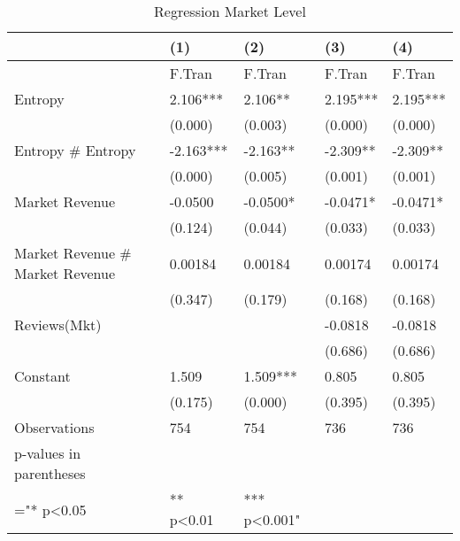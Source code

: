 \begin{table}
\centering
\begin{tabular}{@{}lllll@{}}
\toprule
 & (1) & (2) & (3) & (4) \\ \midrule
 & F.Tran & F.Tran & F.Tran & F.Tran \\
Entropy & 2.106*** & 2.106** & 2.195*** & 2.195*** \\
 & (0.000) & (0.003) & (0.000) & (0.000) \\
Entropy \# Entropy & -2.163*** & -2.163** & -2.309** & -2.309** \\
 & (0.000) & (0.005) & (0.001) & (0.001) \\
Market Revenue & -0.0500 & -0.0500* & -0.0471* & -0.0471* \\
 & (0.124) & (0.044) & (0.033) & (0.033) \\
Market Revenue \# Market Revenue & 0.00184 & 0.00184 & 0.00174 & 0.00174 \\
 & (0.347) & (0.179) & (0.168) & (0.168) \\
Reviews(Mkt) &  &  & -0.0818 & -0.0818 \\
 &  &  & (0.686) & (0.686) \\
Constant & 1.509 & 1.509*** & 0.805 & 0.805 \\
 & (0.175) & (0.000) & (0.395) & (0.395) \\
Observations & 754 & 754 & 736 & 736 \\
p-values in parentheses &  &  &  &  \\
="* p\textless{}0.05 & ** p\textless{}0.01 & *** p\textless{}0.001" &  &  \\ \bottomrule
\end{tabular}
\caption{Regression Market Level}
\label{reg_mkt}
\end{table}